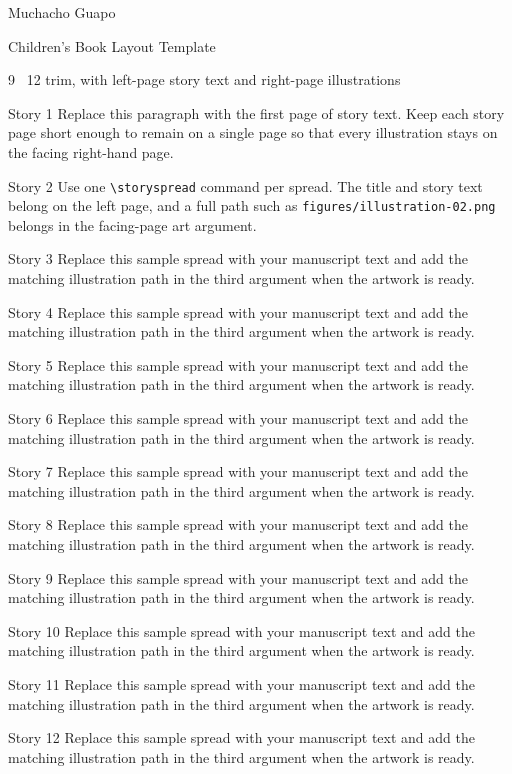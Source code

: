 \documentclass[10pt,twoside]{book}
\newcommand{\booktitle}{Muchacho Guapo}
\newcommand{\samplebookspread}[1]{%
  \storyspread
    {Story #1}
    {Replace this sample spread with your manuscript text and add the matching illustration path in the third argument when the artwork is ready.}
    {}
}
\begin{document}
\begin{titlepage}
  \thispagestyle{empty}
  \vspace*{\fill}
  \begin{center}
    {\chapterfont\fontsize{34}{40}\selectfont \booktitle\par}
    \vspace{1.5em}
    {\headingfont\fontsize{18}{24}\selectfont Children's Book Layout Template\par}
    \vspace{2em}
    {\Large 9 \texttimes\ 12 trim, with left-page story text and right-page illustrations\par}
  \end{center}
  \vspace*{\fill}
\end{titlepage}

\ifodd\value{page}
  \null
  \thispagestyle{empty}
  \newpage
\fi

\storyspread
  {Story 1}
  {Replace this paragraph with the first page of story text. Keep each story page short enough to remain on a single page so that every illustration stays on the facing right-hand page.}
  {}

\storyspread
  {Story 2}
  {Use one \texttt{\textbackslash storyspread} command per spread. The title and story text belong on the left page, and a full path such as \texttt{figures/illustration-02.png} belongs in the facing-page art argument.}
  {}

\samplebookspread{3}
\samplebookspread{4}
\samplebookspread{5}
\samplebookspread{6}
\samplebookspread{7}
\samplebookspread{8}
\samplebookspread{9}
\samplebookspread{10}
\samplebookspread{11}
\samplebookspread{12}
\end{document}
